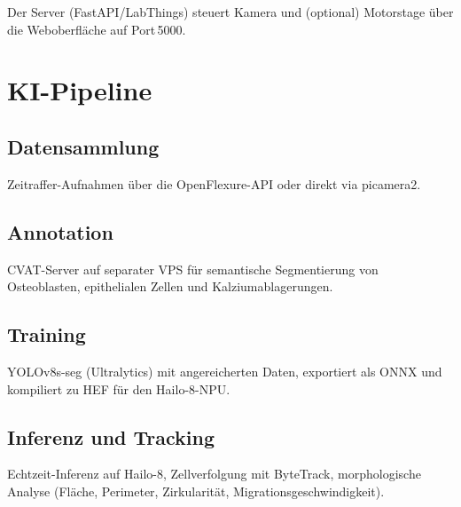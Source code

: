 Der Server (FastAPI/LabThings) steuert Kamera und (optional) Motorstage über
die Weboberfläche auf Port\,5000.

\section{KI-Pipeline}

\subsection{Datensammlung}

Zeitraffer-Aufnahmen über die OpenFlexure-API oder direkt via picamera2.

\subsection{Annotation}

CVAT-Server auf separater VPS für semantische Segmentierung von Osteoblasten,
epithelialen Zellen und Kalziumablagerungen.

\subsection{Training}

YOLOv8s-seg (Ultralytics) mit angereicherten Daten, exportiert als ONNX und
kompiliert zu HEF für den Hailo-8-NPU.

\subsection{Inferenz und Tracking}

Echtzeit-Inferenz auf Hailo-8, Zellverfolgung mit ByteTrack, morphologische
Analyse (Fläche, Perimeter, Zirkularität, Migrationsgeschwindigkeit).